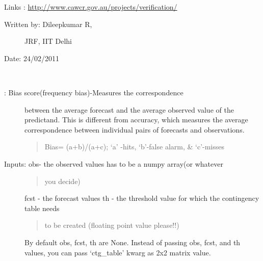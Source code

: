 \documentclass[letterpaper,10pt,english]{sphinxmanual}
\begin{document}
\begin{fulllineitems}
\begin{description}
\begin{description}
\end{description}

Links : \href{http://www.cawcr.gov.au/projects/verification/}{http://www.cawcr.gov.au/projects/verification/}
\begin{description}
\item[{Written by: Dileepkumar R,}] \leavevmode
JRF, IIT Delhi

\end{description}

Date: 24/02/2011

\end{description}

\end{fulllineitems}


\begin{fulllineitems}
\label{diagnosis:ctgfunction.bias_score}~\begin{description}
\item[{{\hyperref[diagnosis:ctgfunction.bias_score]{}}: Bias score(frequency bias)-Measures the correspondence}] \leavevmode
between the average forecast and the average observed value of the
predictand. This is different from accuracy, which measures the
average correspondence between individual pairs of forecasts and
observations.
\begin{quote}

Bias= (a+b)/(a+c); `a' -hits, `b'-false alarm, \& `c'-misses
\end{quote}

\item[{Inputs: obs- the observed values has to be a numpy array(or whatever}] \leavevmode\begin{quote}

you decide)
\end{quote}

fcst - the forecast values
th  - the threshold value for which the contingency table needs
\begin{quote}

to be created (floating point value please!!)
\end{quote}

By default obs, fcst, th are None. Instead of passing obs, fcst,
and th values, you can pass `ctg\_table' kwarg as 2x2 matrix value.


\end{description}
\end{fulllineitems}
\end{document}
